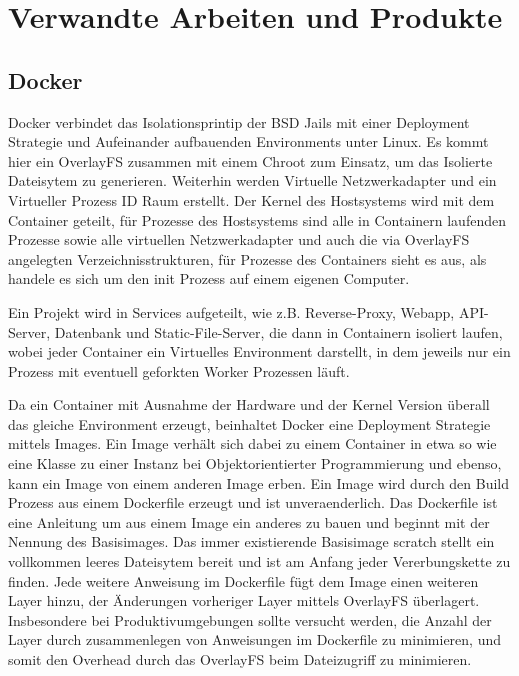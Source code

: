 \section{Verwandte Arbeiten und Produkte}
\label{sec:related-work}


\subsection{Docker} Docker verbindet das Isolationsprintip der BSD
Jails mit einer Deployment Strategie und Aufeinander aufbauenden
Environments unter Linux.  Es kommt hier ein OverlayFS zusammen mit
einem Chroot zum Einsatz, um das Isolierte Dateisytem zu
generieren. Weiterhin werden Virtuelle Netzwerkadapter und ein
Virtueller Prozess ID Raum erstellt. Der Kernel des Hostsystems wird
mit dem Container geteilt, für Prozesse des Hostsystems sind alle in
Containern laufenden Prozesse sowie alle virtuellen Netzwerkadapter
und auch die via OverlayFS angelegten Verzeichnisstrukturen, für
Prozesse des Containers sieht es aus, als handele es sich um den init
Prozess auf einem eigenen Computer.

Ein Projekt wird in Services aufgeteilt, wie z.B. Reverse-Proxy,
Webapp, API-Server, Datenbank und Static-File-Server, die dann in
Containern isoliert laufen, wobei jeder Container ein Virtuelles
Environment darstellt, in dem jeweils nur ein Prozess mit eventuell
geforkten Worker Prozessen läuft.


Da ein Container mit Ausnahme der Hardware und der Kernel Version
überall das gleiche Environment erzeugt, beinhaltet Docker eine
Deployment Strategie mittels Images. Ein Image verhält sich dabei zu
einem Container in etwa so wie eine Klasse zu einer Instanz bei
Objektorientierter Programmierung und ebenso, kann ein Image von einem
anderen Image erben. Ein Image wird durch den Build Prozess aus einem
Dockerfile erzeugt und ist unveraenderlich. Das Dockerfile ist eine Anleitung um aus einem Image ein
anderes zu bauen und beginnt mit der Nennung des Basisimages. Das
immer existierende Basisimage scratch stellt ein vollkommen leeres
Dateisytem bereit und ist am Anfang jeder Vererbungskette zu
finden. Jede weitere Anweisung im Dockerfile fügt dem Image einen
weiteren Layer hinzu, der Änderungen vorheriger Layer mittels
OverlayFS überlagert. Insbesondere bei Produktivumgebungen sollte
versucht werden, die Anzahl der Layer durch zusammenlegen von
Anweisungen im Dockerfile zu minimieren, und somit den Overhead durch
das OverlayFS beim Dateizugriff zu minimieren.

